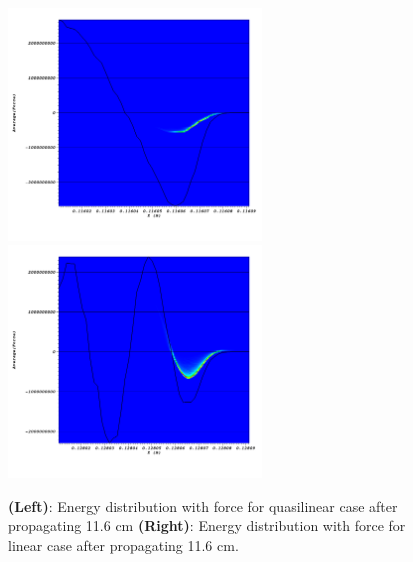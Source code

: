 \documentclass[%
onecolumn, notitlepage,
 amsmath,amssymb,
 aps,
]{article}
\begin{document}
\newpage
\begin{figure}[!ht]
\centering
\includegraphics[width=0.6\textwidth]{quasi_energy_force.png}\\
\includegraphics[width=0.6\textwidth]{linear_energy_force.png}
\caption{{\textbf{(Left)}}{: Energy distribution with force for quasilinear case after propagating 11.6 cm} {\textbf{(Right)}}{: Energy distribution with force for linear case after propagating 11.6 cm.}}
\end{figure}
\end{document}

